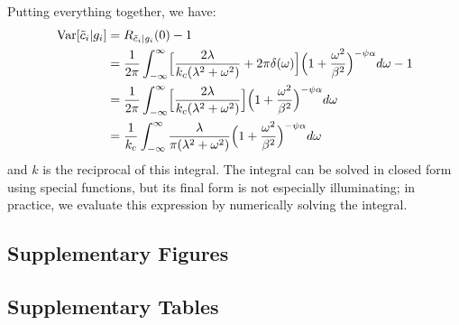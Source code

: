  Putting everything together, we have: 
\begin{align}
\text{Var}[\tilde{c}_i | g_i] &= R_{\tilde{c}_i | g_i}(0) - 1 \\
&= \frac{1}{2\pi} \int_{-\infty}^{\infty} 
\Bigl[\frac{2 \lambda}{k_c (\lambda^2 + \omega^2)} + 2\pi \delta(\omega)\Bigr]
\Bigl( 1 + \frac{\omega^2}{\beta^2}\Bigr )^{-\psi \alpha} d\omega - 1 \\
&= \frac{1}{2\pi} \int_{-\infty}^{\infty} 
\Bigl[\frac{2 \lambda}{k_c (\lambda^2 + \omega^2)} \Bigr] \Bigl( 1 + \frac{\omega^2}{\beta^2}\Bigr )^{-\psi \alpha} d\omega \\
&= \frac{1}{k_c}\int_{-\infty}^{\infty} \frac{\lambda}{\pi (\lambda^2 + \omega^2)} \Bigl( 1 + \frac{\omega^2}{\beta^2}\Bigr )^{-\psi \alpha} d\omega
\end{align}
and $k$ is the reciprocal of this integral. The integral can be solved in closed form using special functions, but its final form is not especially illuminating; in practice, we evaluate this expression by numerically solving the integral. 

\clearpage

\subsection*{Supplementary Figures}

\subsection*{Supplementary Tables}



